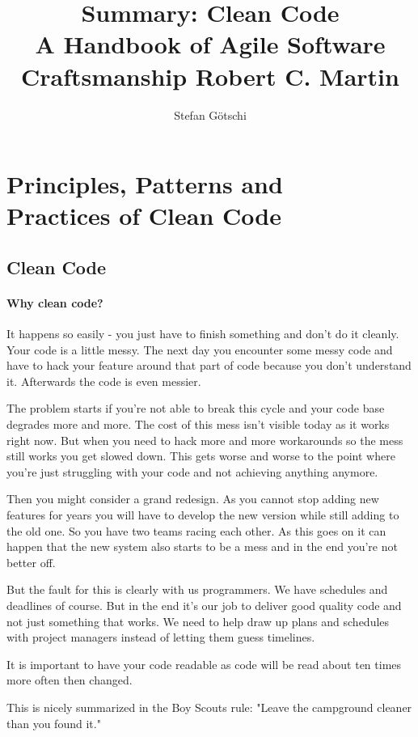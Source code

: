 \documentclass[a4paper, twocolumn]{article}
\title{Summary: Clean Code \\
	\large
	A Handbook of Agile Software Craftsmanship
	Robert C. Martin}
\author{Stefan Götschi}
\begin{document}
\maketitle

\section{Principles, Patterns and \\ Practices of Clean Code}

\subsection{Clean Code}
\paragraph{Why clean code?}
It happens so easily - you just have to finish something and don't do it cleanly. Your code is a little messy. The next day you encounter some messy code and have to hack your feature around that part of code because you don't understand it. Afterwards the code is even messier.

The problem starts if you're not able to break this cycle and your code base degrades more and more. The cost of this mess isn't visible today as it works right now. But when you need to hack more and more workarounds so the mess still works you get slowed down. This gets worse and worse to the point where you're just struggling with your code and not achieving anything anymore.

Then you might consider a grand redesign. As you cannot stop adding new features for years you will have to develop the new version while still adding to the old one. So you have two teams racing each other. As this goes on it can happen that the new system also starts to be a mess and in the end you're not better off.

But the fault for this is clearly with us programmers. We have schedules and deadlines of course. But in the end it's our job to deliver good quality code and not just something that works. We need to help draw up plans and schedules with project managers instead of letting them guess timelines.

It is important to have your code readable as code will be read about ten times more often then changed.

This is nicely summarized in the Boy Scouts rule: "Leave the campground cleaner than you found it."
\end{document}
